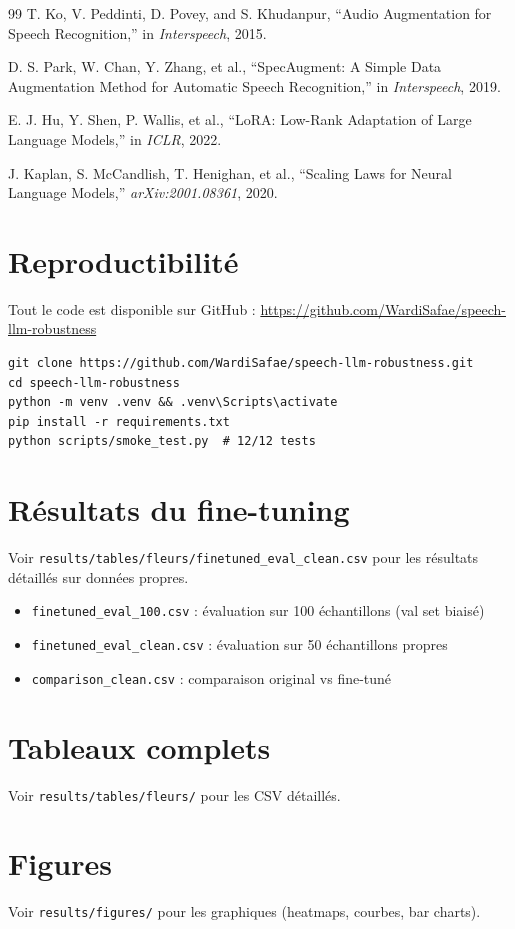 \documentclass[11pt,a4paper]{article}
\begin{document}
\begin{thebibliography}{99}
T. Ko, V. Peddinti, D. Povey, and S. Khudanpur,
``Audio Augmentation for Speech Recognition,''
in \textit{Interspeech}, 2015.

D. S. Park, W. Chan, Y. Zhang, et al.,
``SpecAugment: A Simple Data Augmentation Method for Automatic Speech Recognition,''
in \textit{Interspeech}, 2019.

E. J. Hu, Y. Shen, P. Wallis, et al.,
``LoRA: Low-Rank Adaptation of Large Language Models,''
in \textit{ICLR}, 2022.

J. Kaplan, S. McCandlish, T. Henighan, et al.,
``Scaling Laws for Neural Language Models,''
\textit{arXiv:2001.08361}, 2020.

\end{thebibliography}

\appendix

\section{Reproductibilité}

Tout le code est disponible sur GitHub :
\url{https://github.com/WardiSafae/speech-llm-robustness}

\begin{verbatim}
git clone https://github.com/WardiSafae/speech-llm-robustness.git
cd speech-llm-robustness
python -m venv .venv && .venv\Scripts\activate
pip install -r requirements.txt
python scripts/smoke_test.py  # 12/12 tests
\end{verbatim}

\section{Résultats du fine-tuning}

Voir \texttt{results/tables/fleurs/finetuned\_eval\_clean.csv} pour les
résultats détaillés sur données propres.

\begin{itemize}
	\item \texttt{finetuned\_eval\_100.csv} : évaluation sur 100 échantillons
	(val set biaisé)
	\item \texttt{finetuned\_eval\_clean.csv} : évaluation sur 50 échantillons
	propres
	\item \texttt{comparison\_clean.csv} : comparaison original vs fine-tuné
\end{itemize}

\section{Tableaux complets}

Voir \texttt{results/tables/fleurs/} pour les CSV détaillés.

\section{Figures}

Voir \texttt{results/figures/} pour les graphiques (heatmaps, courbes, bar charts).
\end{document}
